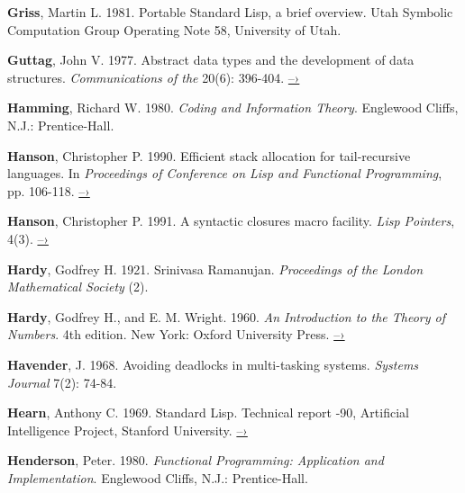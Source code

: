 { \label{Griss 1981}
\textbf{Griss}, Martin L.  1981.  Portable Standard Lisp, a brief
overview.  Utah
Symbolic Computation Group Operating Note 58, University of Utah.

 \label{Guttag 1977}
\textbf{Guttag}, John V.  1977.  Abstract data types and the
development of data
structures.  \textit{Communications of the } 20(6): 396-404.
\href{http://www.unc.edu/~stotts/comp723/guttagADT77.pdf}{–›}

 \label{Hamming 1980}
\textbf{Hamming}, Richard W.  1980.  \textit{Coding and Information
Theory}.  Englewood
Cliffs, N.J.: Prentice-Hall.

 \label{Hanson 1990}
\textbf{Hanson}, Christopher P.  1990.  Efficient stack allocation
for tail-recur\-sive
languages.  In \textit{Proceedings of  Conference on Lisp and
Functional Programming}, pp. 106-118.
\href{https://groups.csail.mit.edu/mac/ftpdir/users/cph/links.ps.gz}{–›}

 \label{Hanson 1991}
\textbf{Hanson}, Christopher P.  1991.  A syntactic closures macro
facility.  \textit{Lisp
Pointers}, 4(3).
\href{http://groups.csail.mit.edu/mac/ftpdir/scheme-reports/synclo.ps}{–›}

 \label{Hardy 1921}
\textbf{Hardy}, Godfrey H.  1921.  Srinivasa Ramanujan.
\textit{Proceedings of the London
Mathematical Society} (2).

 \label{Hardy and Wright 1960}
\textbf{Hardy}, Godfrey H., and E. M. Wright.  1960.  \textit{An
  Introduction to the
Theory of Numbers}.  4th edition.  New York: Oxford University Press.
\href{https://archive.org/details/AnIntroductionToTheTheoryOfNumbers-4thEd-G.h.HardyE.m.Wright}{–›}

 \label{Havender (1968)}
\textbf{Havender}, J. 1968. Avoiding deadlocks in multi-tasking
systems. \textit{
Systems Journal} 7(2): 74-84.

 \label{Hearn 1969}
\textbf{Hearn}, Anthony C.  1969.  Standard Lisp.  Technical report
-90,
Artificial Intelligence Project, Stanford University.
\href{http://www.softwarepreservation.org/projects/LISP/stanford/Hearn-StandardLisp-AIM-90.pdf}{–›}

 \label{Henderson 1980}
\textbf{Henderson}, Peter. 1980.  \textit{Functional Programming:
  Application and
Implementation}. Englewood Cliffs, N.J.: Prentice-Hall.

}
